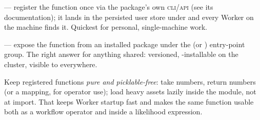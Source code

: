 \begin{description}[style=nextline, leftmargin=1.2em]
  \item[Persist with \Operas's tools] --- register the function once via the package's
        own \textsc{cli}/\textsc{api} (see its documentation); it lands in the
        persisted user store under  and every Worker on the machine
        finds it. Quickest for personal, single-machine work.
  \item[Package an entry point] --- expose the function from an installed package
        under the  (or ) entry-point group. The
        right answer for anything shared: versioned, -installable on the
        cluster, visible to  everywhere.
\end{description}

\begin{jtip}
Keep registered functions \emph{pure and picklable-free}: take numbers, return
numbers (or a mapping, for operator use); load heavy assets lazily inside the module,
not at import. That keeps Worker startup fast and makes the same function usable both
as a workflow operator and inside a likelihood expression.
\end{jtip}
